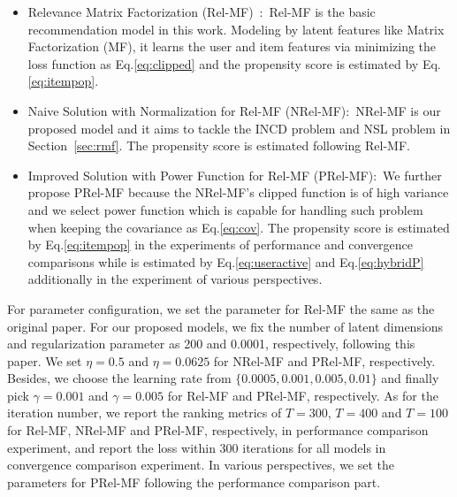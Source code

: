 \documentclass[sigconf]{acmart}
\begin{document}
\begin{itemize}
	\item Relevance Matrix Factorization (Rel-MF)~\cite{saito2020unbiased}$\colon$ Rel-MF is the basic recommendation model in this work. Modeling by latent features like Matrix Factorization (MF), it learns the user and item features via minimizing the loss function as Eq.\eqref{eq:clipped} and the propensity score is estimated by Eq.\eqref{eq:itempop}. 
	\item Naive Solution with Normalization for Rel-MF (NRel-MF)$\colon$ NRel-MF is our proposed model and it aims to tackle the INCD problem and NSL problem in Section~\ref{sec:rmf}. The propensity score is estimated following Rel-MF. 
	\item Improved Solution with Power Function for Rel-MF (PRel-MF)$\colon$ We further propose PRel-MF because the NRel-MF's clipped function is of high variance and we select power function which is capable for handling such problem when keeping the covariance as Eq.\eqref{eq:cov}. The propensity score is estimated by Eq.\eqref{eq:itempop} in the experiments of performance and convergence comparisons while is estimated by Eq.\eqref{eq:useractive} and Eq.\eqref{eq:hybridP} additionally in the experiment of various perspectives. 
\end{itemize}
For parameter configuration, we set the parameter for Rel-MF the same as the original paper\cite{saito2020unbiased}. For our proposed models, we fix the number of latent dimensions and regularization parameter as 200 and 0.0001, respectively, following this paper\cite{saito2020unbiased}.  We set $\eta = 0.5$ and $\eta = 0.0625$ for NRel-MF and PRel-MF, respectively. Besides, we choose the learning rate from $\{0.0005, 0.001, 0.005, 0.01\}$ and finally pick $\gamma = 0.001$ and $\gamma = 0.005$ for Rel-MF and PRel-MF, respectively. As for the iteration number, we report the ranking metrics of $T = 300$,  $T = 400$ and $T = 100$ for Rel-MF, NRel-MF and PRel-MF, respectively, in performance comparison experiment, and report the loss within 300 iterations for all models in convergence comparison experiment. In various perspectives, we set the parameters for PRel-MF following the performance comparison part.

\end{document}
